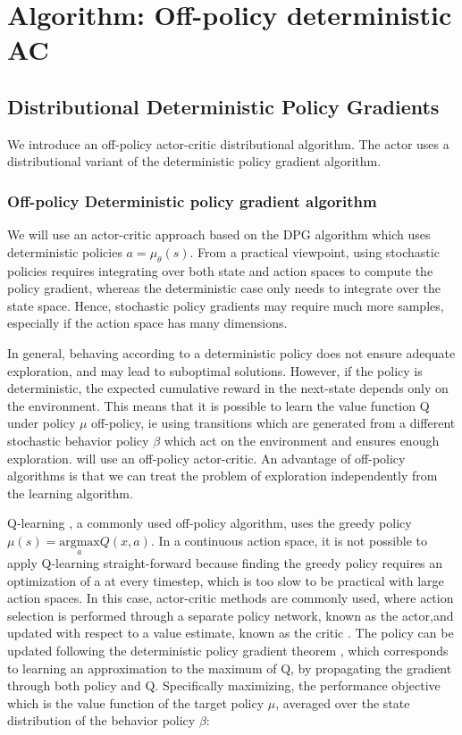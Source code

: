 \chapter{Algorithm: Off-policy deterministic AC}
\label{sec:algo}
\section{Distributional Deterministic Policy Gradients}

We introduce an off-policy actor-critic distributional algorithm.
The actor uses a distributional variant of the deterministic policy gradient algorithm.

\subsection{Off-policy Deterministic policy gradient algorithm}
We will use an actor-critic approach based on the DPG algorithm \citep{silver2014b}
which uses deterministic policies $a=\mu_{\theta}(s)$.
From a practical viewpoint, using stochastic policies requires integrating over both
state and action spaces to compute the policy gradient, whereas the deterministic case
only needs to integrate over the state space. Hence, stochastic policy gradients
may require much more samples, especially if the action space has many dimensions.

In general, behaving according to a deterministic policy does not ensure adequate exploration,
and may lead to suboptimal solutions. 
However, if the policy is deterministic, the expected cumulative reward in the next-state
depends only on the environment. This means that it is possible to learn the value function
Q under policy $\mu$ off-policy, ie using transitions which are generated from a different stochastic
behavior policy $\beta$ which act on the environment and ensures enough exploration.
 will use an off-policy actor-critic.
An advantage of off-policy algorithms is that we can treat the problem of exploration
independently from the learning algorithm.

Q-learning \cite{Watkins1992}, a commonly used off-policy algorithm, uses the greedy policy
$\mu(s)=\underset{a}{\text{argmax}} Q(x,a)$.
In  a  continuous  action  space, it is not possible to apply Q-learning straight-forward because finding the 
greedy policy requires an optimization of a at every timestep, which is too slow to be practical with large action spaces.
In this case, actor-critic methods are commonly used, where action selection is performed through a
separate policy network, known as the actor,and updated with respect to a value estimate,
known as the critic \cite{Sutton1998}.
The policy can be updated following the deterministic policy gradient theorem \cite{silver2014b},
which corresponds to learning an approximation to the maximum of Q,
by propagating the gradient through both policy and Q.
Specifically maximizing, the performance objective which is the value function of the target policy $\mu$, averaged over the state
distribution of the behavior policy $\beta$:

